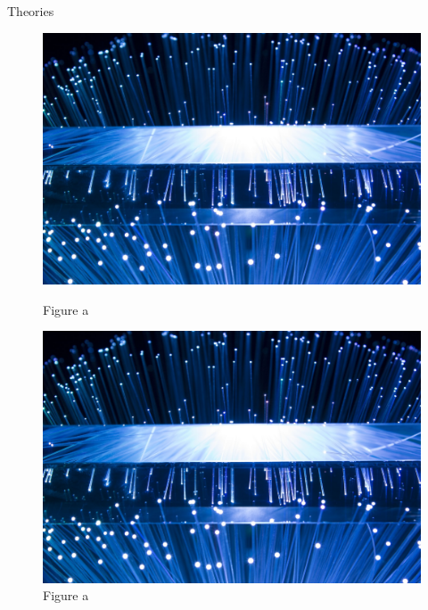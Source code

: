 \documentclass[t]{beamer}
\begin{document}
\begin{frame}{Theories}
\begin{center}
\begin{figure}[htbp]
\begin{minipage}[t]{0.3\textwidth}
            \includegraphics[width=\textwidth]{image/a}
            \caption*{Figure a}
        \end{minipage}
    \hfill
        \begin{minipage}[t]{0.3\textwidth}
            \centering
            \includegraphics[width=\textwidth]{image/a}
            \caption*{Figure a}
        \end{minipage}
        
    \end{figure}
    \end{center}

\end{frame}
\end{document}
